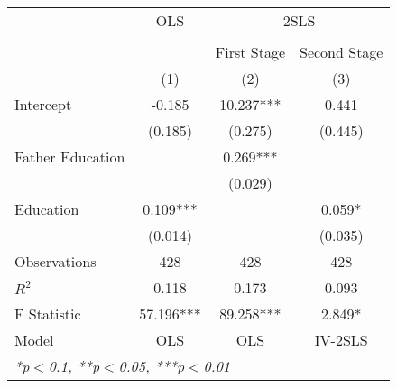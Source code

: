 

\begin{tabular}{lccc}
  \toprule
  \toprule
  & \multicolumn{1}{c}{OLS} & \multicolumn{2}{c}{2SLS} \\
  \cmidrule(lr){2-2}\cmidrule(lr){3-4} \\
  & \multicolumn{1}{c}{} & \multicolumn{1}{c}{First Stage} & \multicolumn{1}{c}{Second Stage} \\
   &   (1) & (2) & (3)\\
  \midrule
  Intercept & -0.185 & 10.237*** & 0.441 \\
   & (0.185) & (0.275) & (0.445) \\
  Father Education &  & 0.269*** &  \\
   &  & (0.029) &  \\
  Education & 0.109*** &  & 0.059* \\
   & (0.014) &  & (0.035) \\
  \midrule
  Observations & 428 & 428 & 428 \\
  $R^2$ & 0.118 & 0.173 & 0.093 \\
  F Statistic & 57.196*** & 89.258*** & 2.849* \\
  Model & OLS & OLS & IV-2SLS \\
  \bottomrule
  \multicolumn{4}{l}{{\small \textit{*p$<$0.1, **p$<$0.05, ***p$<$0.01}}}\\
\end{tabular}
